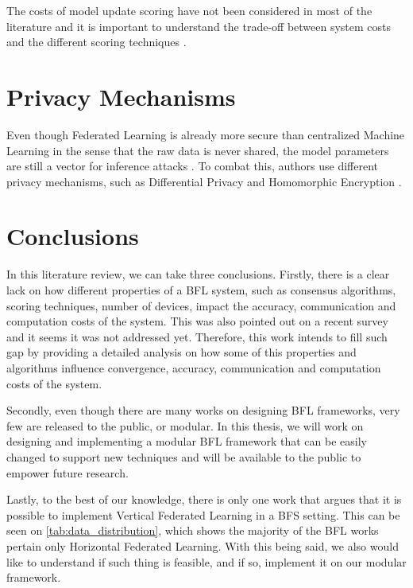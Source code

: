 The costs of model update scoring have not been considered in most of the literature and it is important to understand the trade-off between system costs and the different scoring techniques \cite{9403374, 10.48550/arxiv.2110.02182}.

\section{Privacy Mechanisms}\label{related_work:privacy}

Even though Federated Learning is already more secure than centralized Machine Learning in the sense that the raw data is never shared, the model parameters are still a vector for inference attacks \cite{10.1145/3298981}. To combat this, authors use different privacy mechanisms, such as Differential Privacy \cite{10.48550/arxiv.2007.03856, Peyvandi2022, 9170559} and Homomorphic Encryption \cite{8945913, 8894364}.

\section{Conclusions}\label{related_work:conclusions}

In this literature review, we can take three conclusions. Firstly, there is a clear lack on how different properties of a BFL system, such as consensus algorithms, scoring techniques, number of devices, impact the accuracy, communication and computation costs of the system. This was also pointed out on a recent survey \cite{9403374} and it seems it was not addressed yet. Therefore, this work intends to fill such gap by providing a detailed analysis on how some of this properties and algorithms influence convergence, accuracy, communication and computation costs of the system.

Secondly, even though there are many works on designing BFL frameworks, very few are released to the public, or modular. In this thesis, we will work on designing and implementing a modular BFL framework that can be easily changed to support new techniques and will be available to the public to empower future research.

Lastly, to the best of our knowledge, there is only one work that argues that it is possible to implement Vertical Federated Learning in a BFS setting. This can be seen on \autoref{tab:data_distribution}, which shows the majority of the BFL works pertain only Horizontal Federated Learning. With this being said, we also would like to understand if such thing is feasible, and if so, implement it on our modular framework.




